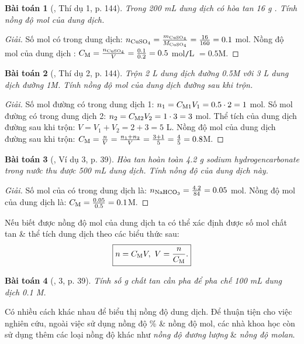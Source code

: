 \documentclass{article}
\newtheorem{baitoan}{Bài toán}
\begin{document}
\begin{baitoan}[\cite{SGK_Hoa_Hoc_8}, Thí dụ 1, p. 144]
	Trong \emph{200 mL} dung dịch có hòa tan \emph{16 g }. Tính nồng độ mol của dung dịch.
\end{baitoan}

\begin{proof}[Giải]
	Số mol  có trong dung dịch: $n_{\ce{CuSO4}} = \frac{m_{\ce{CuSO4}}}{M_{\ce{CuSO4}}} = \frac{16}{160} = 0.1$ mol. Nồng độ mol của dung dịch : $C_{\rm M} = \frac{n_{\ce{CuSO4}}}{V} = \frac{0.1}{0.2} = 0.5$ mol\texttt{/}L $= 0.5$M.
\end{proof}

\begin{baitoan}[\cite{SGK_Hoa_Hoc_8}, Thí dụ 2, p. 144]
	Trộn \emph{2 L} dung dịch đường \emph{0.5M} với \emph{3 L} dung dịch đường \emph{1M}. Tính nồng độ mol của dung dịch đường sau khi trộn.
\end{baitoan}

\begin{proof}[Giải]
	Số mol đường có trong dung dịch 1: $n_1 = C_{\rm M1}V_1 = 0.5\cdot2 = 1$ mol. Số mol đường có trong dung dịch 2: $n_2 = C_{\rm M2}V_2 = 1\cdot3 = 3$ mol. Thể tích của dung dịch đường sau khi trộn: $V = V_1 + V_2 = 2 + 3 = 5$ L. Nồng độ mol của dung dịch đường sau khi trộn: $C_{\rm M} = \frac{n}{V} = \frac{n_1 + n_2}{V} = \frac{3 + 1}{5} = \frac{4}{5} = 0.8$M.
\end{proof}

\begin{baitoan}[\cite{SGK_KHTN_8_Canh_Dieu}, Ví dụ 3, p. 39]
	Hòa tan hoàn toàn \emph{4.2 g} sodium hydrogencarbonate \emph{} trong nước thu được \emph{500 mL} dung dịch. Tính nồng độ của dung dịch này.
\end{baitoan}

\begin{proof}[Giải]
	Số mol của  có trong dung dịch là: $n_{\rm NaHCO_3} = \frac{4.2}{84} = 0.05$ mol. Nồng độ mol của dung dịch  là: $C_{\rm M} = \frac{0.05}{0.5} = 0.1$M.
\end{proof}
Nếu biết được nồng độ mol của dung dịch ta có thể xác định được số mol chất tan \& thể tích dung dịch theo các biểu thức sau:
\begin{align*}
	\boxed{n =C_{\rm M}V,\ V = \frac{n}{C_{\rm M}}.}
\end{align*}

\begin{baitoan}[\cite{SGK_KHTN_8_Canh_Dieu}, 3, p. 39]
	Tính số \emph{g} chất tan cần pha để pha chế \emph{100 mL} dung dịch \emph{ 0.1 M}.
\end{baitoan}
Có nhiều cách khác nhau để biểu thị nồng độ dung dịch. Để thuận tiện cho việc nghiên cứu, ngoài việc sử dụng nồng độ \% \& nồng độ mol, các nhà khoa học còn sử dụng thêm các loại nồng độ khác như \textit{nồng độ đương lượng} \& \textit{nồng độ molan}.
\end{document}
